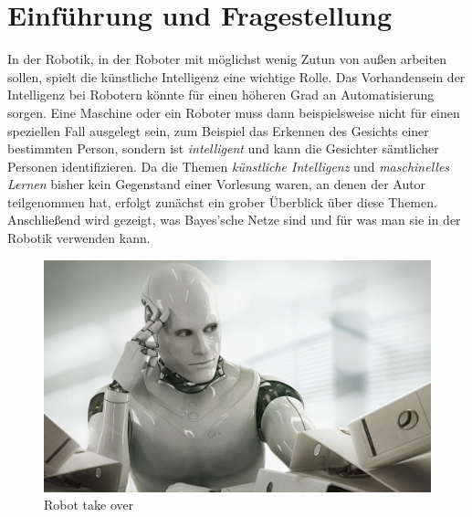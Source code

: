 \chapter{Einführung und Fragestellung}
In der Robotik, in der Roboter mit möglichst wenig Zutun von außen arbeiten sollen, spielt die künstliche Intelligenz eine wichtige Rolle. Das Vorhandensein der Intelligenz bei Robotern könnte für einen höheren Grad an Automatisierung sorgen. Eine Maschine oder ein Roboter muss dann beispielsweise nicht für einen speziellen Fall ausgelegt sein, zum Beispiel das Erkennen des Gesichts einer bestimmten Person, sondern ist \textit{intelligent} und kann die Gesichter sämtlicher Personen identifizieren. 
Da die Themen \textit{künstliche Intelligenz} und \textit{maschinelles Lernen} bisher kein Gegenstand einer Vorlesung waren, an denen der Autor teilgenommen hat, erfolgt zunächst ein grober Überblick über diese Themen.
Anschließend wird gezeigt, was Bayes'sche Netze sind und für was man sie in der Robotik verwenden kann.\begin{figure}%
\includegraphics[scale=0.15]{bilder/RobotTakeOverBS} 
\caption{Robot take over \cite{venturesafrica}}
\label{Entdeckungswahrscheinlichkeit}
\end{figure}
